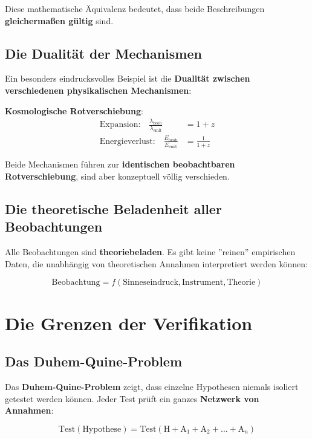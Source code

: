 \documentclass[12pt,a4paper]{report}
\begin{document}
	Diese mathematische Äquivalenz bedeutet, dass beide Beschreibungen \textbf{gleichermaßen gültig} sind.
	
	\subsection{Die Dualität der Mechanismen}
	
	Ein besonders eindrucksvolles Beispiel ist die \textbf{Dualität zwischen verschiedenen physikalischen Mechanismen}:
	
	\textbf{Kosmologische Rotverschiebung}:
	\begin{align}
		\text{Expansion:} \quad \frac{\lambda_{\text{beob}}}{\lambda_{\text{emit}}} &= 1 + z \\
		\text{Energieverlust:} \quad \frac{E_{\text{beob}}}{E_{\text{emit}}} &= \frac{1}{1 + z}
	\end{align}
	
	Beide Mechanismen führen zur \textbf{identischen beobachtbaren Rotverschiebung}, sind aber konzeptuell völlig verschieden.
	
	\subsection{Die theoretische Beladenheit aller Beobachtungen}
	
	Alle Beobachtungen sind \textbf{theoriebeladen}. Es gibt keine ''reinen'' empirischen Daten, die unabhängig von theoretischen Annahmen interpretiert werden können:
	
	\begin{equation}
		\text{Beobachtung} = f(\text{Sinneseindruck}, \text{Instrument}, \text{Theorie})
	\end{equation}
	
	\section{Die Grenzen der Verifikation}
	
	\subsection{Das Duhem-Quine-Problem}
	
	Das \textbf{Duhem-Quine-Problem} zeigt, dass einzelne Hypothesen niemals isoliert getestet werden können. Jeder Test prüft ein ganzes \textbf{Netzwerk von Annahmen}:
	
	\begin{equation}
		\text{Test}(\text{Hypothese}) = \text{Test}(\text{H} + \text{A}_1 + \text{A}_2 + \ldots + \text{A}_n)
	\end{equation}
	
\end{document}
